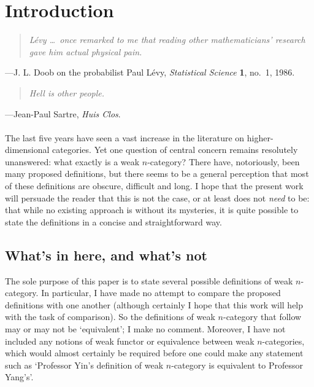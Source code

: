 
\section*{Introduction}		\label{p:intro}

\begin{quote}
\textit{%
L\'evy \ldots\ once remarked to me that reading other mathematicians' research
gave him actual physical pain.}
\end{quote}
---J. L. Doob on the probabilist Paul L\'evy, \emph{Statistical Science}
   \textbf{1}, no.~1, 1986. 

\begin{quote}
\textit{%
Hell is other people.}
\end{quote}
---Jean-Paul Sartre, \emph{Huis Clos}.

\paragraph*{}

The last five years have seen a vast increase in the literature on
higher-dimensional categories.  Yet one question of central concern remains
resolutely unanswered: what exactly is a weak $n$-category?  There have,
notoriously, been many proposed definitions, but there seems to be a general
perception that most of these definitions are obscure, difficult and long.  
I hope that the present work will persuade the reader that this is not the
case, or at least does not \emph{need} to be: that while no existing
approach is without its mysteries, it is quite possible to state the
definitions in a concise and straightforward way.


\subsection*{What's in here, and what's not}

The sole purpose of this paper is to state several possible definitions of
weak $n$-category.  In particular, I have made no attempt to compare the
proposed definitions with one another (although certainly I hope that this
work will help with the task of comparison).  So the definitions of weak
$n$-category that follow may or may not be `equivalent'; I make no comment.
Moreover, I have not included any notions of weak functor or equivalence
between weak $n$-categories, which would almost certainly be required before
one could make any statement such as `Professor Yin's definition of weak
$n$-category is equivalent to Professor Yang's'.

